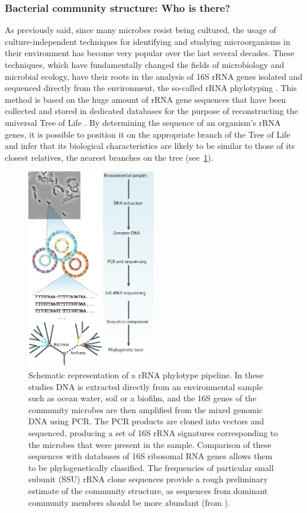 \subsubsection{Bacterial community structure: Who is there? \label{par:whois}}
As previously said, since many microbes resist being cultured, the usage of culture-independent techniques for identifying and studying microorganisms in their environment has become very popular over the last several decades. These techniques, which have fundamentally changed the fields of microbiology and microbial ecology, have their roots in the analysis of 16S rRNA genes isolated and sequenced directly from the environment, the so-called rRNA phylotyping \cite{pace1997molecular, olsen1986microbial}. This method is based on the huge amount of rRNA gene sequences that have been collected and stored in dedicated databases for the purpose of reconstructing the universal Tree of Life \cite{brown2002universal}. By determining the sequence of an organism’s rRNA genes, it is possible to position it on the appropriate branch of the Tree of Life and infer that its biological characteristics are likely to be similar to those of its closest relatives, the nearest branches on the tree (see~\ref{fig:rnaphylo}).\\%
\begin{figure}[!tb]
	\centering
	\includegraphics[width=0.5\textwidth]{./figures/Introduction/rna_phylotyping}
  	\caption{Schematic representation of a rRNA phylotype pipeline. In these studies DNA is extracted directly from an environmental sample such as ocean water, soil or a biofilm, and the 16S genes of the community microbes are then amplified from the mixed genomic DNA using PCR. The PCR products are cloned into vectors and sequenced, producing a set of 16S rRNA signatures corresponding to the microbes that were present in the sample. Comparison of these sequences with databases of 16S ribosomal RNA genes allows them to be phylogenetically classified. The frequencies of particular small subunit (SSU) rRNA clone sequences provide a rough preliminary estimate of the community structure, as sequences from dominant community members should be more abundant (from \cite{tringe2005metagenomics}).\label{fig:rnaphylo}}
\end{figure}%

